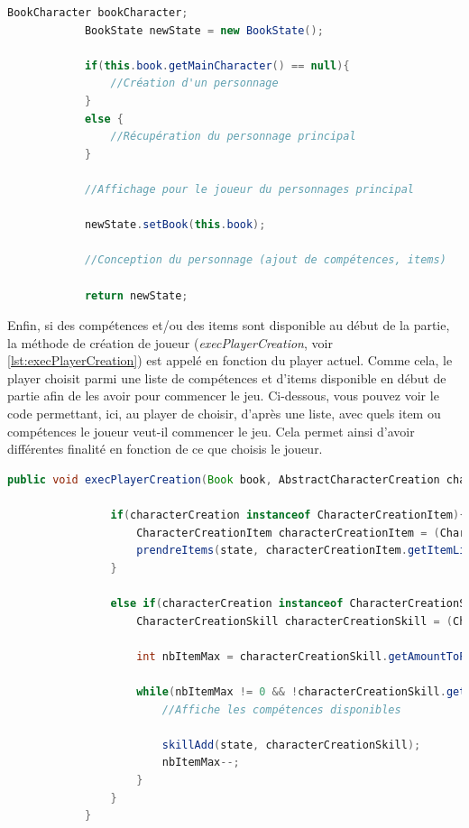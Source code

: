 		\begin{lstlisting}[language=java, caption=createNewState()]
			BookCharacter bookCharacter;
			BookState newState = new BookState();

			if(this.book.getMainCharacter() == null){
				//Création d'un personnage
			}
			else {
				//Récupération du personnage principal
			}

			//Affichage pour le joueur du personnages principal

			newState.setBook(this.book);

			//Conception du personnage (ajout de compétences, items)

			return newState;
		\end{lstlisting}

		Enfin, si des compétences et/ou des items sont disponible au début de la partie, la méthode de création de joueur (\textit{execPlayerCreation}, voir \ref{lst:execPlayerCreation}) est appelé en fonction du player actuel. Comme cela, le player choisit parmi une liste de compétences et d'items disponible en début de partie afin de les avoir pour commencer le jeu. Ci-dessous, vous pouvez voir le code permettant, ici, au player de choisir, d'après une liste, avec quels item ou compétences le joueur veut-il commencer le jeu. Cela permet ainsi d'avoir différentes finalité en fonction de ce que choisis le joueur.\\

		\begin{lstlisting}[language=java, caption=Méthode execPlayerCreation() du player, label=lst:execPlayerCreation]
		public void execPlayerCreation(Book book, AbstractCharacterCreation characterCreation, BookState state){

				if(characterCreation instanceof CharacterCreationItem){
					CharacterCreationItem characterCreationItem = (CharacterCreationItem) characterCreation;
					prendreItems(state, characterCreationItem.getItemLinks(), characterCreationItem.getAmountToPick());
				}

				else if(characterCreation instanceof CharacterCreationSkill){
					CharacterCreationSkill characterCreationSkill = (CharacterCreationSkill) characterCreation;

					int nbItemMax = characterCreationSkill.getAmountToPick();

					while(nbItemMax != 0 && !characterCreationSkill.getSkillLinks().isEmpty()){
						//Affiche les compétences disponibles

						skillAdd(state, characterCreationSkill);
						nbItemMax--;
					}
				}
			}
		\end{lstlisting}

